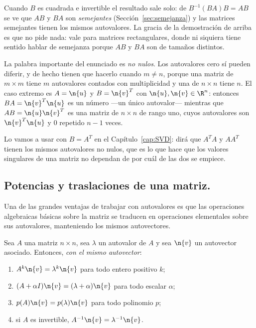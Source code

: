 \begin{remark}\label{obs:AB-BA}
Cuando $B$ es cuadrada e invertible el resultado sale solo: de
$B^{-1}(BA)B=AB$ se ve que $AB$ y $BA$ son \emph{semejantes}
(Sección~\ref{sec:semejanza}) y las matrices semejantes tienen los mismos
autovalores. La gracia de la demostración de arriba es que no pide nada: vale
para matrices rectangulares, donde ni siquiera tiene sentido hablar de
semejanza porque $AB$ y $BA$ son de tamaños distintos.

La palabra importante del enunciado es \emph{no nulos}. Los autovalores cero
sí pueden diferir, y de hecho tienen que hacerlo cuando $m\neq n$, porque una
matriz de $m\times m$ tiene $m$ autovalores contados con multiplicidad y una
de $n\times n$ tiene $n$. El caso extremo es $A=\n{u}$ y $B=\n{v}^T$ con
$\n{u},\n{v}\in\R^n$: entonces $BA=\n{v}^T\n{u}$ es un número ---un único
autovalor--- mientras que $AB=\n{u}\n{v}^T$ es una matriz de $n\times n$ de
rango uno, cuyos autovalores son $\n{v}^T\n{u}$ y $0$ repetido $n-1$ veces.

Lo vamos a usar con $B=A^T$ en el Capítulo~\ref{cap:SVD}: dirá que $A^TA$ y
$AA^T$ tienen los mismos autovalores no nulos, que es lo que hace que los
valores singulares de una matriz no dependan de por cuál de las dos se
empiece.
\end{remark}

\medskip

\subsection{Potencias y traslaciones de una matriz.} 
Una de las grandes ventajas de trabajar con autovalores es que las operaciones algebraicas básicas sobre la matriz se traducen en operaciones elementales sobre sus autovalores, manteniendo los mismos autovectores.

\begin{prop}\label{prop:potencias}
Sea $A$ una matriz $n\times n$, sea $\lambda$ un autovalor de $A$ y sea $\n{v}$ un
autovector asociado. Entonces, \emph{con el mismo autovector}:
\begin{enumerate}
\item $A^k\n{v}=\lambda^k\n{v}$ para todo entero positivo $k$;
\item $(A+\alpha I)\n{v}=(\lambda+\alpha)\n{v}$ para todo escalar $\alpha$;
\item $p(A)\n{v}=p(\lambda)\n{v}$ para todo polinomio $p$;
\item si $A$ es invertible, $A^{-1}\n{v}=\lambda^{-1}\n{v}$.
\end{enumerate}
\end{prop}

